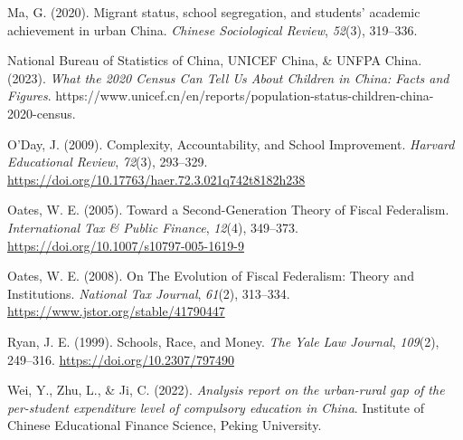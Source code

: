 \documentclass[
  man,
  floatsintext,
  longtable,
  nolmodern,
  notxfonts,
  notimes,
  colorlinks=true,linkcolor=blue,citecolor=blue,urlcolor=blue]{apa7}
\newlength{\cslhangindent}
\newenvironment{CSLReferences}[2] %
 {\begin{list}{}{%
  \setlength{\itemindent}{0pt}
  \setlength{\leftmargin}{0pt}
  \setlength{\parsep}{0pt}
  \ifodd #1
   \setlength{\leftmargin}{\cslhangindent}
   \setlength{\itemindent}{-1\cslhangindent}
  \fi
  \setlength{\itemsep}{#2\baselineskip}}}
 {\end{list}}
\begin{document}
\begin{CSLReferences}{1}{0}
Ma, G. (2020). Migrant status, school segregation, and students'
academic achievement in urban {China}. \emph{Chinese Sociological
Review}, \emph{52}(3), 319--336.

National Bureau of Statistics of China, UNICEF China, \& UNFPA China.
(2023). \emph{What the 2020 {Census Can Tell Us About Children} in
{China}: {Facts} and {Figures}}.
https://www.unicef.cn/en/reports/population-status-children-china-2020-census.

O'Day, J. (2009). Complexity, {Accountability}, and {School
Improvement}. \emph{Harvard Educational Review}, \emph{72}(3), 293--329.
\url{https://doi.org/10.17763/haer.72.3.021q742t8182h238}

Oates, W. E. (2005). Toward a {Second-Generation Theory} of {Fiscal
Federalism}. \emph{International Tax \& Public Finance}, \emph{12}(4),
349--373. \url{https://doi.org/10.1007/s10797-005-1619-9}

Oates, W. E. (2008). On {The Evolution} of {Fiscal Federalism}: {Theory}
and {Institutions}. \emph{National Tax Journal}, \emph{61}(2), 313--334.
\url{https://www.jstor.org/stable/41790447}

Ryan, J. E. (1999). Schools, {Race}, and {Money}. \emph{The Yale Law
Journal}, \emph{109}(2), 249--316. \url{https://doi.org/10.2307/797490}

Wei, Y., Zhu, L., \& Ji, C. (2022). \emph{Analysis report on the
urban-rural gap of the per-student expenditure level of compulsory
education in {China}}. Institute of Chinese Educational Finance Science,
Peking University.

\end{CSLReferences}
\end{document}
